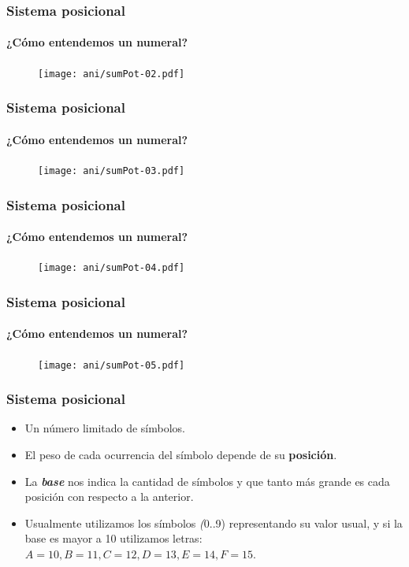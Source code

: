 \documentclass[11pt,a4paper,spanish]{beamer}
\begin{document}
\begin{frame}

\frametitle{Sistema posicional}
\framesubtitle{¿Cómo entendemos un numeral?}

\begin{figure}
    \centering
    \texttt{[image: ani/sumPot-02.pdf]}
    \captionsetup{textfont=tiny,labelformat=empty}
    \caption{}
\end{figure}

\end{frame}

\begin{frame}

\frametitle{Sistema posicional}
\framesubtitle{¿Cómo entendemos un numeral?}

\begin{figure}
    \centering
    \texttt{[image: ani/sumPot-03.pdf]}
    \captionsetup{textfont=tiny,labelformat=empty}
    \caption{}
\end{figure}

\end{frame}

\begin{frame}

\frametitle{Sistema posicional}
\framesubtitle{¿Cómo entendemos un numeral?}

\begin{figure}
    \centering
    \texttt{[image: ani/sumPot-04.pdf]}
    \captionsetup{textfont=tiny,labelformat=empty}
    \caption{}
\end{figure}

\end{frame}

\begin{frame}

\frametitle{Sistema posicional}
\framesubtitle{¿Cómo entendemos un numeral?}

\begin{figure}
    \centering
    \texttt{[image: ani/sumPot-05.pdf]}
    \captionsetup{textfont=tiny,labelformat=empty}
    \caption{}
\end{figure}

\end{frame}

\begin{frame}

\frametitle{Sistema posicional}

\begin{itemize}
    \item Un número limitado de símbolos.
    \item El peso de cada ocurrencia del símbolo depende de su
        \textbf{posición}.
    \item La \textbf{\emph{base}} nos indica la cantidad de símbolos y que
        tanto más grande es cada posición con respecto a la anterior.
    \item Usualmente utilizamos los símbolos \emph(0..9) representando su
        valor usual, y si la base es mayor a 10 utilizamos letras: $ A=10,
        B=11, C=12, D=13, E=14, F=15$.
\end{itemize}

\end{frame}
\end{document}
